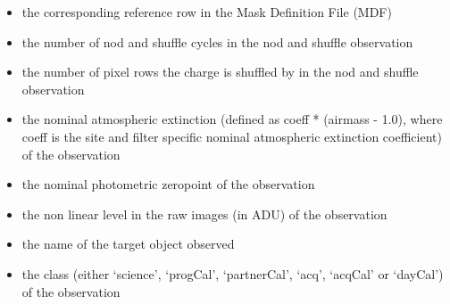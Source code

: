 \documentclass[letterpaper,10pt,english]{sphinxmanual}
\begin{document}
\begin{itemize}
\item {} 
the corresponding reference row in the Mask Definition File (MDF)

\end{itemize}

\begin{itemize}
\item {} 
the number of nod and shuffle cycles in the nod and shuffle observation

\end{itemize}

\begin{itemize}
\item {} 
the number of pixel rows the charge is shuffled by in the nod and shuffle
observation

\end{itemize}

\begin{itemize}
\item {} 
the nominal atmospheric extinction (defined as coeff * (airmass - 1.0), where
coeff is the site and filter specific nominal atmospheric extinction
coefficient) of the observation

\end{itemize}

\begin{itemize}
\item {} 
the nominal photometric zeropoint of the observation

\end{itemize}

\begin{itemize}
\item {} 
the non linear level in the raw images (in ADU) of the observation

\end{itemize}

\begin{itemize}
\item {} 
the name of the target object observed

\end{itemize}

\begin{itemize}
\item {} 
the class (either `science', `progCal', `partnerCal', `acq', `acqCal' or
`dayCal') of the observation

\end{itemize}
\end{document}

